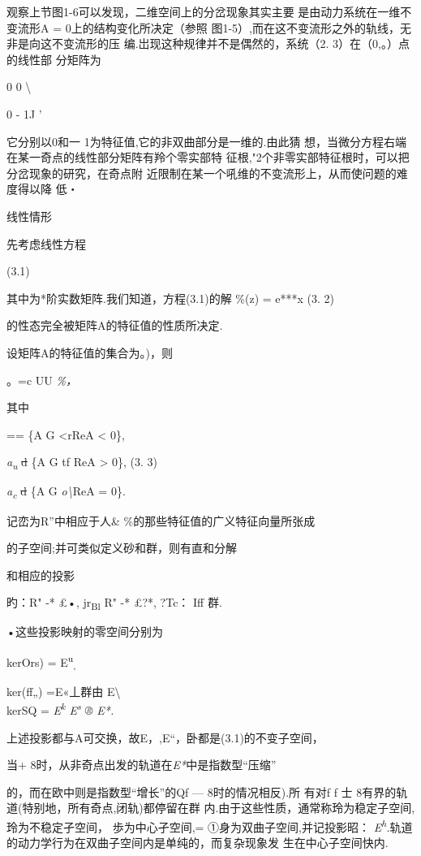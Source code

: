 \documentclass{article}
\begin{document}
观察上节图1-6可以发现，二维空间上的分岔现象其实主要
是由动力系统在一维不变流形A = 0上的结构变化所决定（参照
图1-5）,而在这不变流形之外的轨线，无非是向这不变流形的压
编.岀现这种规律并不是偶然的，系统（2. 3）在（0,。）点的线性部 分矩阵为

0 0 \textbackslash{}

0 - 1J '

它分别以0和一 1为特征值,它的非双曲部分是一维的.由此猜
想，当微分方程右端在某一奇点的线性部分矩阵有羚个零实部特
征根,"2个非零实部特征根时，可以把分岔现象的研究，在奇点附
近限制在某一个吼维的不变流形上，从而使问题的难度得以降 低・

线性情形

先考虑线性方程

(3.1)

其中为*阶实数矩阵.我们知道，方程(3.1)的解 \%(z) = e***x (3. 2)

的性态完全被矩阵A的特征值的性质所决定.

设矩阵A的特征值的集合为。)，则

。=c UU \emph{\%，}

其中

== \{A G \textless{}r\textbar{}ReA \textless{} 0\},

\emph{a\textsubscript{u}} \sout{d} \{A G tf \textbar{}ReA \textgreater{}
0\}, (3. 3)

\emph{a\textsubscript{c}} \sout{d} \{A G \emph{o\textbackslash{}}ReA =
0\}.

记峦为R''中相应于人\& \%的那些特征值的广义特征向量所张成

的子空间;并可类似定义砂和群，则有直和分解

和相应的投影

旳：R" -* £•, jr\textsubscript{Bl} R" -* £?*, ?Tc： Iff 群.

•这些投影映射的零空间分别为

kerOrs) = E\textsuperscript{u}\textsubscript{,}

ker(ff„) =E«丄群由 E\textbackslash{}\\
kerSQ = \emph{E\textsuperscript{k} E\textsuperscript{s} ® E*.}

上述投影都与A可交换，故E，,E``，卧都是(3.1)的不变子空间，

当+ 8时，从非奇点出发的轨道在\emph{E*}中是指数型``压缩''

的，而在欧中则是指数型``增长''的Qf --- 8时的情况相反).所 有对f f 士
8有界的轨道(特别地，所有奇点,闭轨)都停留在群
内.由于这些性质，通常称玲为稳定子空间,玲为不稳定孑空间，
歩为中心孑空间,= ①身为双曲子空间,并记投影昭：
\emph{E\textsuperscript{h}.}轨道的动力学行为在双曲子空间内是单纯的，而复杂现象发
生在中心子空间快内.
\end{document}
